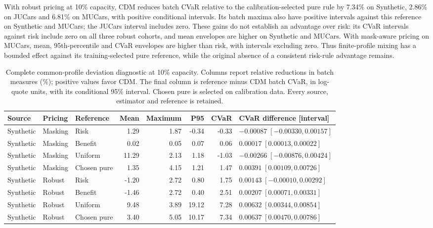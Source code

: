 \documentclass[10pt,journal]{IEEEtran}
\begin{document}
With robust pricing at 10\% capacity, CDM reduces batch CVaR relative to
the calibration-selected pure rule by 7.34\% on Synthetic, 2.86\% on JUCars
and 6.81\% on MUCars, with positive conditional intervals. Its batch maxima
also have positive intervals against this reference on Synthetic and MUCars;
the JUCars interval includes zero. These gains do not establish an advantage
over risk: its CVaR intervals against risk include zero on all three robust
cohorts, and mean envelopes are higher on Synthetic and MUCars. With
mask-aware pricing on MUCars, mean, 95th-percentile and CVaR envelopes are
higher than risk, with intervals excluding zero. Thus finite-profile mixing
has a bounded effect against its training-selected pure reference, while
the original absence of a consistent risk-rule advantage remains.

\begin{table}[t]
\centering
\caption{Complete common-profile deviation diagnostic at 10\% capacity.
Columns report relative reductions in batch measures (\%); positive values
favor CDM. The final column is reference minus CDM batch CVaR, in log-quote
units, with its conditional 95\% interval. Chosen pure is selected on
calibration data. Every source, estimator and reference is retained.}
\label{tab:cdm_deviation_generalization}
\setlength{\tabcolsep}{3pt}
\begin{tabular}{lllrrrrl}
\toprule
Source & Pricing & Reference & Mean & Maximum & P95 & CVaR & CVaR difference [interval]\\
\midrule
Synthetic & Masking & Risk & 1.29 & 1.87 & -0.34 & -0.33 & $-0.00087\;[-0.00330,0.00157]$\\
Synthetic & Masking & Benefit & 0.02 & 0.05 & 0.07 & 0.06 & $0.00017\;[0.00013,0.00022]$\\
Synthetic & Masking & Uniform & 11.29 & 2.13 & 1.18 & -1.03 & $-0.00266\;[-0.00876,0.00424]$\\
Synthetic & Masking & Chosen pure & 1.35 & 4.15 & 1.21 & 1.47 & $0.00391\;[0.00109,0.00726]$\\
Synthetic & Robust & Risk & -1.20 & 2.72 & 0.80 & 1.75 & $0.00143\;[-0.00010,0.00292]$\\
Synthetic & Robust & Benefit & -1.46 & 2.72 & 0.40 & 2.51 & $0.00207\;[0.00071,0.00331]$\\
Synthetic & Robust & Uniform & 9.48 & 3.89 & 19.12 & 7.28 & $0.00632\;[0.00344,0.00854]$\\
Synthetic & Robust & Chosen pure & 3.40 & 5.05 & 10.17 & 7.34 & $0.00637\;[0.00470,0.00786]$\\

\end{tabular}
\end{table}
\end{document}
